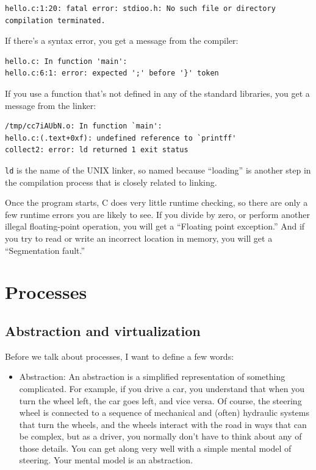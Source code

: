 \documentclass[12pt]{book}
\begin{document}
{\begin{verbatim}
hello.c:1:20: fatal error: stdioo.h: No such file or directory
compilation terminated.
\end{verbatim}

If there's a syntax error, you get a message from the compiler:

\begin{verbatim}
hello.c: In function 'main':
hello.c:6:1: error: expected ';' before '}' token
\end{verbatim}

If you use a function that's not defined in any of the standard
libraries, you get a message from the linker:

\begin{verbatim}
/tmp/cc7iAUbN.o: In function `main':
hello.c:(.text+0xf): undefined reference to `printff'
collect2: error: ld returned 1 exit status
\end{verbatim}

{\tt ld} is the name of the UNIX linker, so named because ``loading''
is another step in the compilation process that is closely related
to linking.

Once the program starts, C does very little runtime checking,
so there are only a few runtime errors you are likely to see.  If you
divide by zero, or perform another illegal floating-point operation, you
will get a ``Floating point exception.''  And if you try to read or
write an incorrect location in memory, you will get a ``Segmentation
fault.''



\chapter{Processes}

\section{Abstraction and virtualization}

Before we talk about processes, I want to define a few words:

\begin{itemize}

\item Abstraction: An abstraction is a simplified representation
of something complicated.  For example, if you drive a car, you
understand that when you turn the wheel left, the car goes left,
and vice versa.  Of course, the steering wheel is connected to
a sequence of mechanical and (often) hydraulic systems that turn
the wheels, and the wheels interact with the road in ways that
can be complex, but as a driver, you normally don't have to think
about any of those details.  You can get along very well with
a simple mental model of steering.  Your mental model is an
abstraction.


\end{itemize}}
\end{document}
